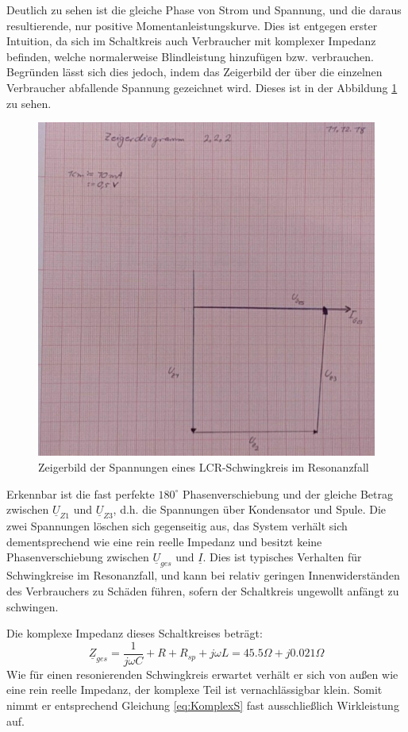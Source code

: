 Deutlich zu sehen ist die gleiche Phase von Strom und Spannung, und die daraus resultierende, nur positive Momentanleistungskurve. Dies ist entgegen erster Intuition, da sich im Schaltkreis auch Verbraucher mit komplexer Impedanz befinden, welche normalerweise Blindleistung hinzufügen bzw. verbrauchen.
Begründen lässt sich dies jedoch, indem das Zeigerbild der über die einzelnen Verbraucher abfallende Spannung gezeichnet wird. Dieses ist in der Abbildung \ref{fig:ZeigerbildResonanz} zu sehen.

\begin{figure}[H]
\centering
\includegraphics[width=0.7\linewidth]{Images/Zeigerdiagramm2-2-2.jpg}
\caption{Zeigerbild der Spannungen eines LCR-Schwingkreis im Resonanzfall}
\label{fig:ZeigerbildResonanz}
\end{figure}

Erkennbar ist die fast perfekte $180^\circ$ Phasenverschiebung und der gleiche Betrag zwischen $\underline{U}_{Z1}$ und $\underline{U}_{Z3}$, d.h. die Spannungen über Kondensator und Spule. Die zwei Spannungen löschen sich gegenseitig aus, das System verhält sich dementsprechend wie eine rein reelle Impedanz und besitzt keine Phasenverschiebung zwischen $\underline{U}_{ges}$ und $\underline{I}$. Dies ist typisches Verhalten für Schwingkreise im Resonanzfall, und kann bei relativ geringen Innenwiderständen des Verbrauchers zu Schäden führen, sofern der Schaltkreis ungewollt anfängt zu schwingen.

Die komplexe Impedanz dieses Schaltkreises beträgt:
\begin{equation*}
\underline{Z}_{ges} = \frac{1}{j\omega C} + R + R_{sp} + j\omega L = 45.5\Omega + j0.021\Omega
\end{equation*}
Wie für einen resonierenden Schwingkreis erwartet verhält er sich von außen wie eine rein reelle Impedanz, der komplexe Teil ist vernachlässigbar klein. Somit nimmt er entsprechend Gleichung \eqref{eq:KomplexS} fast ausschließlich Wirkleistung auf.

